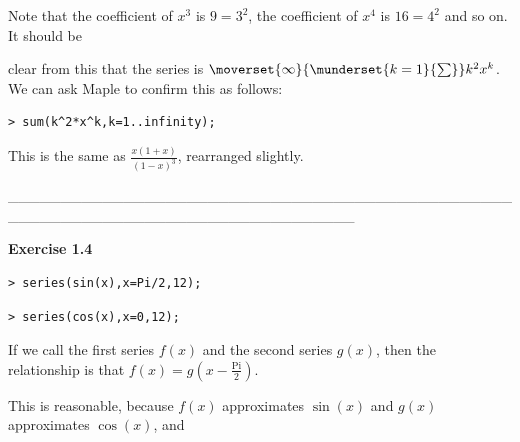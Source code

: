 \documentclass{article}
\begin{document}
\begin{Maple Normal}
Note that the coefficient of 
$x^{3}$ is 
$9=3^{2}$, the coefficient of 
$x^{4}$ is 
$16=4^{2}$ and so on.  It should be 
\end{Maple Normal}
\begin{Maple Normal}
clear from this that the series is 
$\moverset{\infty}{\munderset{k =1}{\sum}}k^{2} x^{k}$.  We can ask Maple to confirm this as follows:
\end{Maple Normal}
\begin{Maple Normal}

\end{Maple Normal}
\begin{lstlisting}
> sum(k^2*x^k,k=1..infinity);
\end{lstlisting}
\begin{Maple Normal}

\end{Maple Normal}
\begin{Maple Normal}
This is the same as 
$\frac{x (1+x)}{(1-x)^{3}}$,  rearranged slightly.
\end{Maple Normal}
\begin{Maple Normal}
\_\_\_\_\_\_\_\_\_\_\_\_\_\_\_\_\_\_\_\_\_\_\_\_\_\_\_\_\_\_\_\_\_\_\_\_\_\_\_\_\_\_\_\_\_\_\_\_\_\_\_\_\_\_\_\_\_\_\_\_\_\_\_\_\_\_\_\_\_\_\_\_\_\_\_\_\_\_\_\_\_
\end{Maple Normal}
\begin{Maple Heading 2}
\textbf{Exercise 1.4}
\end{Maple Heading 2}
\begin{Maple Normal}

\end{Maple Normal}
\begin{lstlisting}
> series(sin(x),x=Pi/2,12);
\end{lstlisting}
\begin{lstlisting}
> series(cos(x),x=0,12);
\end{lstlisting}
\begin{Maple Normal}

\end{Maple Normal}
\begin{Maple Normal}
If we call the first series 
$f (x)$ and the second series 
$g (x)$, then the relationship is that 
$f (x)=g (x -\frac{\mathrm{Pi}}{2})$.
\end{Maple Normal}
\begin{Maple Normal}
This is reasonable, because 
$f (x)$ approximates 
$\sin (x)$ and 
$g (x)$ approximates 
$\cos (x)$, and
\end{Maple Normal}
\end{document}
